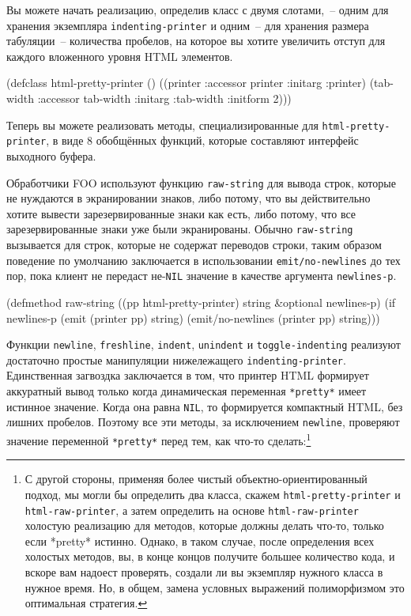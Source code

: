 Вы можете начать реализацию, определив класс с двумя слотами,~-- одним для хранения
экземпляра \lstinline{indenting-printer} и одним~-- для хранения размера табуляции~--
количества пробелов, на которое вы хотите увеличить отступ для каждого вложенного уровня
HTML элементов.

\begin{myverb}
(defclass html-pretty-printer ()
  ((printer   :accessor printer   :initarg :printer)
   (tab-width :accessor tab-width :initarg :tab-width :initform 2)))
\end{myverb}

Теперь вы можете реализовать методы, специализированные для \lstinline{html-pretty-printer}, в
виде 8 обобщённых функций, которые составляют интерфейс выходного буфера.

Обработчики FOO используют функцию \lstinline{raw-string} для вывода строк, которые не
нуждаются в экранировании знаков, либо потому, что вы действительно хотите вывести
зарезервированные знаки как есть, либо потому, что все зарезервированные знаки уже были
экранированы. Обычно \lstinline{raw-string} вызывается для строк, которые не содержат переводов
строки, таким образом поведение по умолчанию заключается в использовании
\lstinline{emit/no-newlines} до тех пор, пока клиент не передаст не-\lstinline{NIL} значение в
качестве аргумента \lstinline{newlines-p}.

\begin{myverb}
(defmethod raw-string ((pp html-pretty-printer) string &optional newlines-p)
  (if newlines-p
    (emit (printer pp) string)
    (emit/no-newlines (printer pp) string)))
\end{myverb}

Функции \lstinline{newline}, \lstinline{freshline}, \lstinline{indent}, \lstinline{unindent} и
\lstinline{toggle-indenting} реализуют достаточно простые манипуляции нижележащего
\lstinline{indenting-printer}. Единственная загвоздка заключается в том, что принтер HTML
формирует аккуратный вывод только когда динамическая переменная \lstinline{*pretty*} имеет
истинное значение. Когда она равна \lstinline{NIL}, то формируется компактный HTML, без лишних
пробелов. Поэтому все эти методы, за исключением \lstinline{newline}, проверяют значение
переменной \lstinline{*pretty*} перед тем, как что-то сделать:\footnote{С другой стороны,
  применяя более чистый объектно-ориентированный подход, мы могли бы определить два
  класса, скажем \lstinline{html-pretty-printer} и \lstinline{html-raw-printer}, а затем определить
  на основе \lstinline{html-raw-printer} холостую реализацию для методов, которые должны делать
  что-то, только если *pretty* истинно. Однако, в таком случае, после определения всех
  холостых методов, вы, в конце концов получите большее количество кода, и вскоре вам
  надоест проверять, создали ли вы экземпляр нужного класса в нужное время. Но, в общем,
  замена условных выражений полиморфизмом это оптимальная стратегия.}

